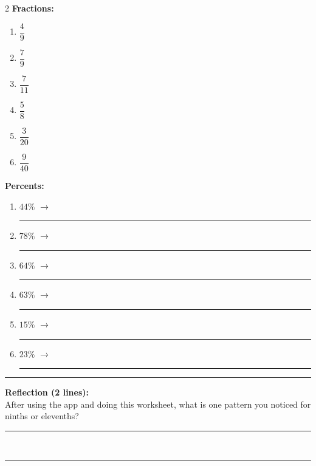 \documentclass[12pt]{article}
\newcommand{\blank}{\rule{3.3cm}{0.4pt}}
\newcommand{\blanklong}{\rule{7.2cm}{0.4pt}}
\begin{document}
\begin{multicols}{2}
\textbf{Fractions:}\\[-6pt]
\begin{enumerate}[label=\textbf{\Alph*.},itemsep=2pt]
\item \(\dfrac{4}{9}\)
\item \(\dfrac{7}{9}\)
\item \(\dfrac{7}{11}\)
\item \(\dfrac{5}{8}\)
\item \(\dfrac{3}{20}\)
\item \(\dfrac{9}{40}\)
\end{enumerate}

\columnbreak

\textbf{Percents:}\\[-6pt]
\begin{enumerate}[label=\textbf{1.},itemsep=2pt]
\item \(44\%\) \;\;\(\rightarrow\)\; \blank
\item \(78\%\) \;\;\(\rightarrow\)\; \blank
\item \(64\%\) \;\;\(\rightarrow\)\; \blank
\item \(63\%\) \;\;\(\rightarrow\)\; \blank
\item \(15\%\) \;\;\(\rightarrow\)\; \blank
\item \(23\%\) \;\;\(\rightarrow\)\; \blank
\end{enumerate}
\end{multicols}

\vspace{6pt}
\hrule
\vspace{4pt}
{\Large \textbf{Reflection (2 lines):}}\\
After using the app and doing this worksheet, what is one pattern you noticed for ninths or elevenths?\\
\blanklong\\
\blanklong
\end{document}
